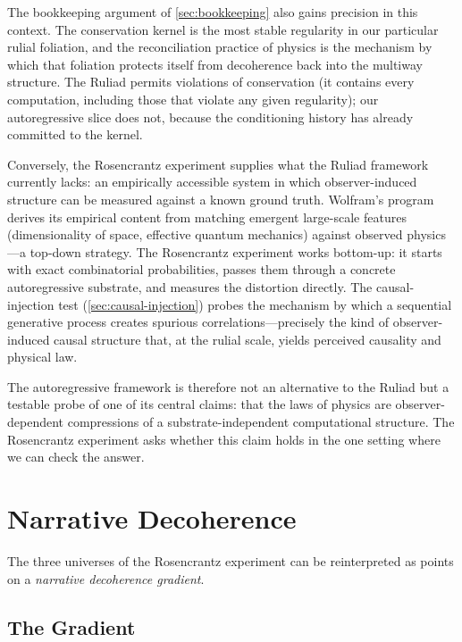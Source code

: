 \documentclass[12pt,a4paper]{article}
\theoremstyle{definition}
\theoremstyle{remark}
\begin{document}
The bookkeeping argument of \cref{sec:bookkeeping} also gains
precision in this context.  The conservation kernel is the most
stable regularity in our particular rulial foliation, and the
reconciliation practice of physics is the mechanism by which that
foliation protects itself from decoherence back into the multiway
structure.  The Ruliad permits violations of conservation (it
contains every computation, including those that violate any given
regularity); our autoregressive slice does not, because the
conditioning history has already committed to the kernel.

Conversely, the Rosencrantz experiment supplies what the Ruliad
framework currently lacks: an empirically accessible system in
which observer-induced structure can be measured against a known
ground truth.  Wolfram's program derives its empirical content from
matching emergent large-scale features (dimensionality of space,
effective quantum mechanics) against observed physics---a
top-down strategy.  The Rosencrantz experiment works bottom-up: it
starts with exact combinatorial probabilities, passes them through
a concrete autoregressive substrate, and measures the distortion
directly.  The causal-injection test (\cref{sec:causal-injection})
probes the mechanism by which a sequential generative process
creates spurious correlations---precisely the kind of
observer-induced causal structure that, at the rulial scale, yields
perceived causality and physical law.

The autoregressive framework is therefore not an alternative to the
Ruliad but a testable probe of one of its central claims: that the
laws of physics are observer-dependent compressions of a
substrate-independent computational structure.  The Rosencrantz
experiment asks whether this claim holds in the one setting where
we can check the answer.


\section{Narrative Decoherence}
\label{sec:decoherence}

The three universes of the Rosencrantz experiment can be reinterpreted
as points on a \emph{narrative decoherence gradient}.

\subsection{The Gradient}
\end{document}
